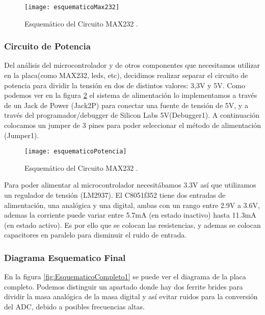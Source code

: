 \begin{figure}[h]
  \centering
  \texttt{[image: esquematicoMax232]}
  \caption{Esquemático del Circuito MAX232 .}\label{fig:esquematicoMax232}
\end{figure}


\subsubsection{Circuito de Potencia}
\label{circuito_potencia}

Del análisis del microcontrolador y de otros componentes que necesitamos utilizar en la placa(como MAX232, leds, etc), decidimos realizar separar el circuito de potencia para dividir la tensión en dos de distintos valores: 3,3V y 5V.
Como podemos ver en la figura \ref{fig:esquematicoPotencia} el sistema de alimentación lo implementamos a través de un Jack de Power (Jack2P) para conectar una fuente de tensión de 5V, y a través del programador/debugger de Silicon Labs 5V(Debugger1). A continuación colocamos un jumper de 3 pines para poder seleccionar el método de alimentación (Jumper1).

\begin{figure}
  \centering
  \texttt{[image: esquematicoPotencia]}
  \caption{Esquemático del Circuito MAX232 .}\label{fig:esquematicoPotencia}
\end{figure}

Para poder alimentar al microcontrolador necesitábamos 3.3V así que utilizamos un regulador de tensión (LM2937). El C8051f352 tiene dos entradas de alimentación, una analógica y una digital, ambas con un rango entre 2.9V a 3.6V, ademas la corriente puede variar entre 5.7mA (en estado inactivo) hasta 11.3mA (en estado activo). Es por ello que se colocan las resistencias, y ademas se colocan capacitores en paralelo para disminuir el ruido de entrada.


\subsubsection{Diagrama Esquematico Final}
\label{esquematico_final_1}

En la figura \ref{fig:EsquematicoCompleto1} se puede ver el diagrama de la placa completo. 
Podemos distinguir un apartado donde hay dos ferrite brides para dividir la masa analógica de la masa digital y así evitar ruidos para la conversión del ADC, debido a posibles frecuencias altas.

